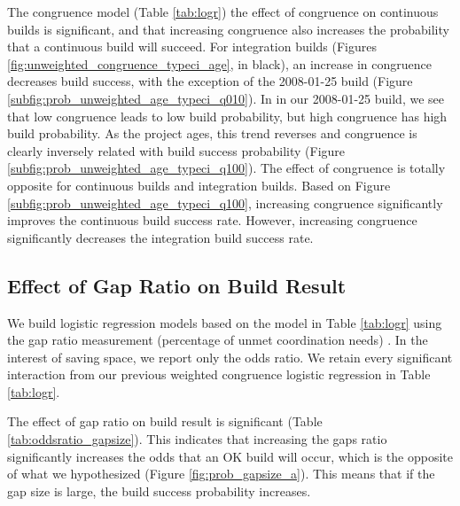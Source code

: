 The congruence model (Table \ref{tab:logr}) the effect of congruence on continuous builds is significant, and that increasing congruence also increases the probability that a continuous build will succeed. 
For integration builds (Figures \ref{fig:unweighted_congruence_typeci_age}, in black), an increase in congruence decreases build success, with the exception of the 2008-01-25 build (Figure \ref{subfig:prob_unweighted_age_typeci_q010}). In in our 2008-01-25 build, we see that low congruence leads to low build probability, but high congruence has high build probability. As the project ages, this trend reverses and congruence is clearly inversely related with build success probability (Figure \ref{subfig:prob_unweighted_age_typeci_q100}).
The effect of congruence is totally opposite for continuous builds and integration builds. Based on Figure \ref{subfig:prob_unweighted_age_typeci_q100}, increasing congruence significantly improves the continuous build success rate. However, increasing congruence significantly decreases the integration build success rate.


\subsection{Effect of Gap Ratio on Build Result}
\label{sec:gapsizeresult}
We build logistic regression models based on the model in Table \ref{tab:logr} using the gap ratio measurement (percentage of unmet coordination needs) . In the interest of saving space, we report only the odds ratio. We retain every significant interaction from our previous weighted congruence logistic regression in Table \ref{tab:logr}.

The effect of gap ratio on build result is significant (Table \ref{tab:oddsratio_gapsize}). This indicates that increasing the gaps ratio significantly increases the odds that an OK build will occur, which is the opposite of what we hypothesized (Figure \ref{fig:prob_gapsize_a}). This means that if the gap size is large, the build success probability increases.

